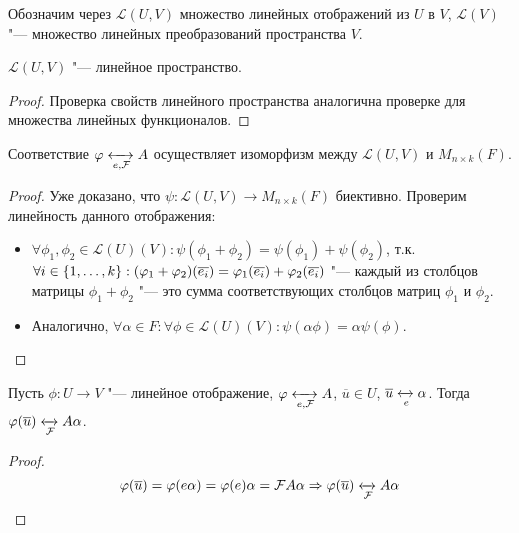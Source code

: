 \begin{definition}
	Обозначим через $\mathcal{L}(U, V)$ множество линейных отображений из $U$ в $V$, $\mathcal{L}(V)$ "--- множество линейных преобразований пространства $V$.
\end{definition}

\begin{proposition}
	$\mathcal{L}(U, V)$ "--- линейное пространство.
\end{proposition}

\begin{proof}
	Проверка свойств линейного пространства аналогична проверке для множества линейных функционалов.
\end{proof}

\begin{proposition}
	Соответствие $\phi \xleftrightarrow[e, \mathcal{F}]{} A$ осуществляет изоморфизм между $\mathcal{L}(U, V)$ и $M_{n\times k}(F)$.
\end{proposition}

\begin{proof}
	Уже доказано, что $\psi : \mathcal{L}(U, V) \rightarrow M_{n\times k}(F)$ биективно. Проверим линейность данного отображения:
	\begin{itemize}
		\item $\forall \phi_1, \phi_2 \in \mathcal{L}(U)(V): \psi(\phi_1 + \phi_2) = \psi(\phi_1) + \psi(\phi_2)$, т.\:к. $\forall i \hm{\in} \{1, \dots, k\}: (\phi_1 + \phi_2)(\overline{e_i}) = \phi_1(\overline{e_i}) + \phi_2(\overline{e_i})$ "--- каждый из столбцов матрицы $\phi_1 + \phi_2$ "--- это сумма соответствующих столбцов матриц $\phi_1$ и $\phi_2$.
		\item Аналогично, $\forall \alpha \in F: \forall \phi \in \mathcal{L}(U)(V): \psi(\alpha\phi) = \alpha\psi(\phi)$.
	\end{itemize}
\end{proof}

\begin{proposition}
	Пусть $\phi: U \rightarrow V$ "--- линейное отображение, $\phi \xleftrightarrow[e, \mathcal{F}]{} A$, $\overline{u} \in U$, $\overline{u} \xleftrightarrow[e]{} \alpha$. Тогда $\phi(\overline{u}) \xleftrightarrow[\mathcal{F}]{} A\alpha$.
\end{proposition}

\begin{proof}
	\[\phi(\overline{u}) = \phi(e\alpha) = \phi(e)\alpha = \mathcal{F}	A\alpha \Rightarrow \phi(\overline{u}) \xleftrightarrow[\mathcal{F}]{} A\alpha\]
\end{proof}

